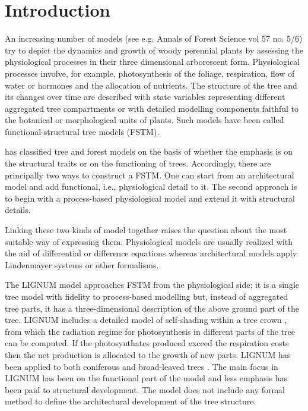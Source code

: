 \section{Introduction} 

An increasing number of models  (see e.g. Annals of Forest Science vol
57 no.  5/6) try to depict  the dynamics and growth of woody perennial
plants  by  assessing  the  physiological  processes  in  their  three
dimensional  arborescent form.   Physiological processes  involve, for
example, photosynthesis of the  foliage, respiration, flow of water or
hormones and the  allocation of nutrients.  The structure  of the tree
and  its  changes  over   time  are  described  with  state  variables
representing different  aggregated tree compartments  or with detailed
modelling components faithful to  the botanical or morphological units
of plants.   Such models  have been called  functional-structural tree
models (FSTM).

\citet{kurth:94b} has  classified tree and forest models  on the basis
of  whether  the  emphasis is  on  the  structural  traits or  on  the
functioning of trees.  Accordingly,  there are principally two ways to
construct  a  FSTM.   One   can  start  from  an  architectural  model
\citep{jaeger:92,  kurth:94} and  add functional,  i.e., physiological
detail to  it.  The second approach  is to begin with  a process-based
physiological  model \citep{makela:86, landsberg:86,  sievanen:93} and
extend it with structural details.

Linking these  two kinds of  model together raises the  question about
the  most suitable way  of expressing  them. Physiological  models are
usually realized with the  aid of differential or difference equations
\citep{landsberg:86}  whereas architectural  models  apply Lindenmayer
systems  \citep{kurth:99,pp:90}  or  other  formalisms. 

The LIGNUM model approaches FSTM  from the physiological side; it is a
single tree model  \citep{perttunen:96} with fidelity to process-based
modelling  \citep[see  e.g.][]{nikinmaa:92, sievanen:93,  makela:97-1}
but,  instead of  aggregated tree  parts, it  has  a three-dimensional
description of the  above ground part of the  tree.  LIGNUM includes a
detailed    model    of    self-shading    within   a    tree    crown
\citep{perttunen:96,  perttunen:01}, from  which the  radiation regime
for photosynthesis in different parts of the tree can be computed.  If
the photosynthates produced exceed  the respiration costs then the net
production is allocated  to the growth of new  parts.  LIGNUM has been
applied to both coniferous \citep{perttunen:96,lo:99} and broad-leaved
trees \citep{perttunen:01}.  The main focus  in LIGNUM has been on the
functional  part of  the  model and  less  emphasis has  been paid  to
structural development.  The model  does not include any formal method
to define the architectural development of the tree structure.

